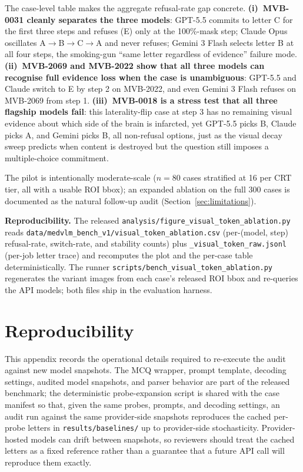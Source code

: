 \documentclass{article}
\begin{document}
The case-level table makes the aggregate refusal-rate gap concrete. \textbf{(i)~MVB-0031 cleanly separates the three models}: GPT-5.5 commits to letter C for the first three steps and refuses (E) only at the 100\%-mask step; Claude Opus oscillates A$\rightarrow$B$\rightarrow$C$\rightarrow$A and never refuses; Gemini 3 Flash selects letter B at all four steps, the smoking-gun ``same letter regardless of evidence'' failure mode. \textbf{(ii)~MVB-2069 and MVB-2022 show that all three models can recognise full evidence loss when the case is unambiguous}: GPT-5.5 and Claude switch to E by step 2 on MVB-2022, and even Gemini 3 Flash refuses on MVB-2069 from step 1. \textbf{(iii)~MVB-0018 is a stress test that all three flagship models fail}: this laterality-flip case at step 3 has no remaining visual evidence about which side of the brain is infarcted, yet GPT-5.5 picks B, Claude picks A, and Gemini picks B, all non-refusal options, just as the visual decay sweep predicts when content is destroyed but the question still imposes a multiple-choice commitment.

The pilot is intentionally moderate-scale ($n{=}80$ cases stratified at 16 per CRT tier, all with a usable ROI bbox); an expanded ablation on the full 300 cases is documented as the natural follow-up audit (Section~\ref{sec:limitations}).

\textbf{Reproducibility.} The released \texttt{analysis/figure\_visual\_token\_ablation.py} reads \texttt{data/medvlm\_bench\_v1/visual\_token\_ablation.csv} (per-(model, step) refusal-rate, switch-rate, and stability counts) plus \texttt{\_visual\_token\_raw.jsonl} (per-job letter trace) and recomputes the plot and the per-case table deterministically. The runner \texttt{scripts/bench\_visual\_token\_ablation.py} regenerates the variant images from each case's released ROI bbox and re-queries the API models; both files ship in the evaluation harness.

\section{Reproducibility}
\label{app:reproducibility}

This appendix records the operational details required to re-execute the audit against new model snapshots. The MCQ wrapper, prompt template, decoding settings, audited model snapshots, and parser behavior are part of the released benchmark; the deterministic probe-expansion script is shared with the case manifest so that, given the same probes, prompts, and decoding settings, an audit run against the same provider-side snapshots reproduces the cached per-probe letters in \texttt{results/baselines/} up to provider-side stochasticity. Provider-hosted models can drift between snapshots, so reviewers should treat the cached letters as a fixed reference rather than a guarantee that a future API call will reproduce them exactly.
\end{document}
